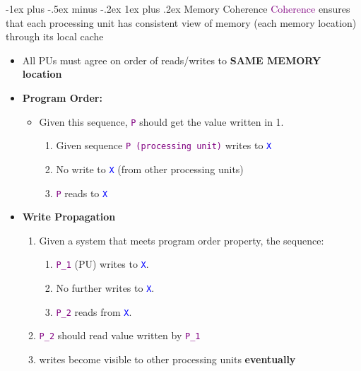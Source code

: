 \documentclass[10pt,landscape]{article}
\makeatletter
\newcommand{\subsubsubsection}{\@startsection{subsubsection}{3}{0mm}%
                                {-1ex plus -.5ex minus -.2ex}%
                                {1ex plus .2ex}%
                                {\normalfont\scriptsize\bfseries}}
\makeatother
\begin{document}
\begin{multicols*}{3}
\subsubsubsection{Memory Coherence}
\textcolor{purple}{Coherence} ensures that each processing unit has consistent view of memory (each memory location) through its local cache
\begin{itemize}[topsep=0pt,noitemsep,wide=0pt, leftmargin=\dimexpr{} + 2\relax]
    \item All PUs must agree on order of reads/writes to \textbf{SAME MEMORY location}
    \item \textbf{Program Order:}
    \begin{itemize}[topsep=0pt,noitemsep,wide=0pt, leftmargin=\dimexpr{} + 2\relax]
        \item Given this sequence, \textcolor{purple}{\texttt{P}} should get the value written in 1.
        \begin{enumerate}[topsep=0pt,noitemsep,wide=0pt, leftmargin=\dimexpr\labelwidth + 2\labelsep\relax]
            \item Given sequence \textcolor{purple}{\texttt{P (processing unit)}} writes to \textcolor{blue}{\texttt{X}}
            \item No write to \textcolor{blue}{\texttt{X}} (from other processing units)
            \item \textcolor{purple}{\texttt{P}} reads to \textcolor{blue}{\texttt{X}}
        \end{enumerate}
    \end{itemize}
    \item \textbf{Write Propagation}
    \begin{enumerate}[topsep=0pt,noitemsep,wide=0pt, leftmargin=\dimexpr\labelwidth + 2\labelsep\relax]
        \item Given a system that meets program order property, the sequence:
        \begin{enumerate}[topsep=0pt,noitemsep,wide=0pt, leftmargin=\dimexpr\labelwidth + 2\labelsep\relax]
            \item \textcolor{purple}{\texttt{P\_1}} (PU) writes to \textcolor{blue}{\texttt{X}}.
            \item No further writes to \textcolor{blue}{\texttt{X}}.
            \item \textcolor{purple}{\texttt{P\_2}} reads from \textcolor{blue}{\texttt{X}}.
        \end{enumerate}
        \item \textcolor{purple}{\texttt{P\_2}} should read value written by \textcolor{purple}{\texttt{P\_1}}
        \item writes become visible to other processing units \textbf{eventually}

\end{enumerate}
\end{itemize}
\end{multicols*}
\end{document}
